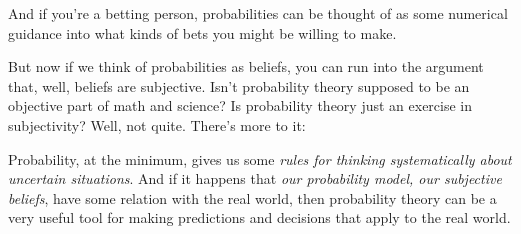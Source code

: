 \documentclass[pdftex, brazil, 12pt, twoside]{article}
\begin{document}
\begin{figure}[H]
  \begin{center}
  \end{center}
\end{figure}

And if you're a betting person, probabilities can be
thought of as some numerical guidance into what kinds of
bets you might be willing to make.

But now if we think of probabilities as beliefs, you
can run into the argument that, well, beliefs are
subjective.
Isn't probability theory supposed to be an objective
part of math and science?
Is probability theory just an exercise in subjectivity?
Well, not quite.
There's more to it:

\begin{figure}[H]
  \begin{center}
  \end{center}
\end{figure}

Probability, at the minimum, gives us some \emph{rules for
thinking systematically about uncertain situations}.
And if it happens that \emph{our probability model, our
subjective beliefs}, have some relation with the real world,
then probability theory can be a very useful tool for making
predictions and decisions that apply to the real world.
\end{document}
